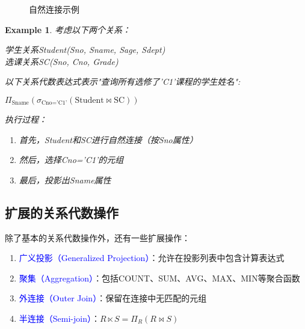 \documentclass{../../note}
\newtheorem{example}{Example}
\begin{document}
\begin{figure}[h]
  \centering
  \caption{自然连接示例}
\end{figure}

\begin{example}
  考虑以下两个关系：

  学生关系Student(Sno, Sname, Sage, Sdept)\\
  选课关系SC(Sno, Cno, Grade)

  以下关系代数表达式表示"查询所有选修了'C1'课程的学生姓名":

  $\Pi_\text{Sname}(\sigma_\text{Cno='C1'}(\text{Student} \bowtie \text{SC}))$

  执行过程：
  \begin{enumerate}
    \item 首先，Student和SC进行自然连接（按Sno属性）
    \item 然后，选择Cno='C1'的元组
    \item 最后，投影出Sname属性
  \end{enumerate}
\end{example}

\subsection{扩展的关系代数操作}

除了基本的关系代数操作外，还有一些扩展操作：

\begin{enumerate}
  \item \textcolor{blue}{广义投影（Generalized Projection）}：允许在投影列表中包含计算表达式
  \item \textcolor{blue}{聚集（Aggregation）}：包括COUNT、SUM、AVG、MAX、MIN等聚合函数
  \item \textcolor{blue}{外连接（Outer Join）}：保留在连接中无匹配的元组
  \item \textcolor{blue}{半连接（Semi-join）}：$R \ltimes S = \Pi_R(R \bowtie S)$
\end{enumerate}
\end{document}
